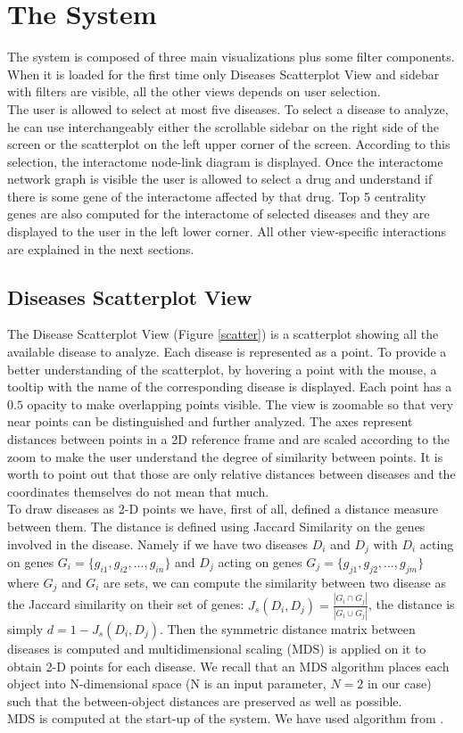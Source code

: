 \documentclass[12pt,twocolumn,twoside]{article}
\begin{document}
	\section*{The System}
	The system is composed of three main visualizations plus some filter components. When it is loaded for the first time only Diseases Scatterplot View and sidebar with filters are visible, all the other views depends on user selection.\\ 
	The user is allowed to select at most five diseases. To select a disease to analyze, he can use interchangeably either the scrollable sidebar on the right side of the screen or the scatterplot on the left upper corner of the screen. According to this selection, the interactome node-link diagram is displayed. Once the interactome network graph is visible the user is allowed to select a drug and understand if there is some gene of the interactome affected by that drug. Top 5 centrality genes are also computed for the interactome of selected diseases and they are displayed to the user in the left lower corner. All other view-specific interactions are explained in the next sections.
	\subsection*{Diseases Scatterplot View}
	The Disease Scatterplot View (Figure \ref{scatter}) is a scatterplot showing all the available disease to analyze. Each disease is represented as a point. To provide a better understanding of the scatterplot, by hovering a point with the mouse, a tooltip with the name of the corresponding disease is displayed. Each point has a $0.5$ opacity to make overlapping points visible. The view is zoomable so that very near points can be distinguished and further analyzed. The axes represent distances between points in a 2D reference frame and are scaled according to the zoom to make the user understand the degree of similarity between points. It is worth to point out that those are only relative distances between diseases and the coordinates themselves do not mean that much. \\ 
	To draw diseases as 2-D points we have, first of all, defined a distance measure between them. The distance is defined using Jaccard Similarity on the genes involved in the disease. Namely if we have two diseases $D_i$ and $D_j$ with $D_i$ acting on genes $G_i=\{g_{i1},g_{i2},...,g_{in}\}$ and $D_j$ acting on genes $G_j=\{g_{j1},g_{j2},...,g_{jm}\}$ where $G_j$ and $G_i$ are sets, we can compute the similarity between two disease as the Jaccard similarity on their set of genes: $J_s(D_i,D_j) = \frac{|G_i \cap G_j|}{|G_i \cup G_j|}$, the distance is simply $d =1-J_s(D_i,D_j)$.  Then the symmetric distance matrix between diseases is computed and multidimensional scaling (MDS) is applied on it to obtain 2-D points for each disease. We recall that an MDS algorithm places each object into N-dimensional space (N is an input parameter, $N=2$ in our case) such that the between-object distances are preserved as well as possible.\\ MDS is computed at the start-up of the system. We have used algorithm from \cite{mds_js}.
	
\end{document}

